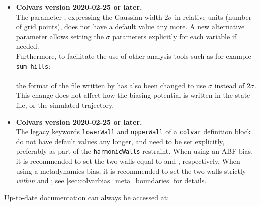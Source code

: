 \begin{itemize}
\item \textbf{Colvars version 2020-02-25 or later.}\\
  The parameter , expressing the Gaussian width $2\sigma$ in relative units (number of grid points), does not have a default value any more.
  A new alternative parameter  allows setting the $\sigma$ parameters explicitly for each variable if needed.\\
  Furthermore, to facilitate the use of other analysis tools such as for example \texttt{sum\_hills}:\\
\\
  the format of the file written by  has also been changed to use $\sigma$ instead of $2\sigma$.
  This change does not affect how the biasing potential is written in the state file, or the simulated trajectory.

\item \textbf{Colvars version 2020-02-25 or later.}\\
  The legacy keywords \texttt{lowerWall} and \texttt{upperWall} of a \texttt{colvar} definition block do not have default values any longer, and need to be set explicitly, preferably as part of the \texttt{harmonicWalls} restraint.
  When using an ABF bias, it is recommended to set the two walls equal to  and , respectively.
  When using a metadynamics bias, it is recommended to set the two walls strictly \emph{within}  and ; see \ref{sec:colvarbias_meta_boundaries} for details.

\end{itemize}

\noindent{}Up-to-date documentation can always be accessed at:\\


